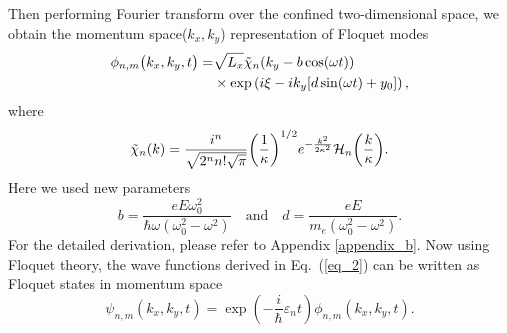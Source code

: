 Then performing Fourier transform over the confined two-dimensional space, we obtain the momentum space($k_x,k_y$) representation of Floquet modes
\begin{equation} \label{eq_9}
  \begin{aligned}
    \phi_{n,m}\big(k_x,k_y,t\big)  = &
    {\sqrt{L_x}}
    \tilde{\chi}_{n}\qty(k_y - b\cos(\omega t)) \\
    & \times
    \text{exp}\left(
      i\xi
      -ik_y  \qty[d\sin(\omega t) + y_0]
    \right),
  \end{aligned}
\end{equation}
where
\begin{equation} \label{eq_10}
  \tilde{\chi}_{n}\qty(k) =
  \frac{i^n}{\sqrt{2^{n} n! \sqrt{\pi}}}
  \qty(\frac{1}{\kappa})^{1/2}
  e^{-\frac{k^2}{2 \kappa^2}}
  \mathcal{H}_{n} \qty(\frac{k}{\kappa}).
\end{equation}
Here we used new parameters
\begin{equation} \label{eq_11}
  b =
  \frac{eE\omega_0^2}{\hbar\omega(\omega_0^2 - \omega^2)} \quad \text{and} \quad
  d =
 \frac{eE}{m_e(\omega_0^2 - \omega^2)}.
\end{equation}
For the detailed derivation, please refer to Appendix \ref{appendix_b}. Now using Floquet theory, the wave functions derived in Eq.~(\ref{eq_2}) can be written as Floquet states in momentum space
\begin{equation} \label{eq_12}
  \psi_{n,m}(k_x,k_y,t) =
  \exp(-\frac{i}{\hbar}\varepsilon_{n}t)   \phi_{n,m} (k_x,k_y,t).
\end{equation}
